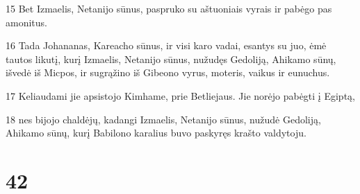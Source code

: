 \par 15 Bet Izmaelis, Netanijo sūnus, paspruko su aštuoniais vyrais ir pabėgo pas amonitus. 
\par 16 Tada Johananas, Kareacho sūnus, ir visi karo vadai, esantys su juo, ėmė tautos likutį, kurį Izmaelis, Netanijo sūnus, nužudęs Gedoliją, Ahikamo sūnų, išvedė iš Micpos, ir sugrąžino iš Gibeono vyrus, moteris, vaikus ir eunuchus. 
\par 17 Keliaudami jie apsistojo Kimhame, prie Betliejaus. Jie norėjo pabėgti į Egiptą, 
\par 18 nes bijojo chaldėjų, kadangi Izmaelis, Netanijo sūnus, nužudė Gedoliją, Ahikamo sūnų, kurį Babilono karalius buvo paskyręs krašto valdytoju.



\chapter{42}


